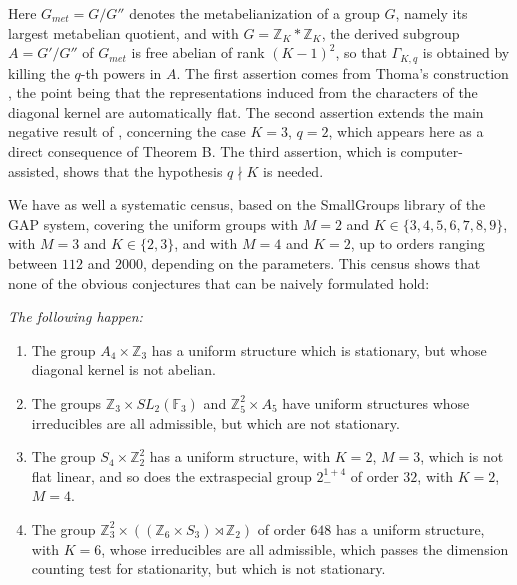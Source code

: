 \documentclass[12pt]{amsart}
\theoremstyle{definition}
\begin{document}
\medskip

Here $G_{met}=G/G''$ denotes the metabelianization of a group $G$, namely its largest metabelian quotient, and with $G=\mathbb Z_K*\mathbb Z_K$, the derived subgroup $A=G'/G''$ of $G_{met}$ is free abelian of rank $(K-1)^2$, so that $\Gamma_{K,q}$ is obtained by killing the $q$-th powers in $A$. The first assertion comes from Thoma's construction \cite{tho}, the point being that the representations induced from the characters of the diagonal kernel are automatically flat. The second assertion extends the main negative result of \cite{bc2}, concerning the case $K=3$, $q=2$, which appears here as a direct consequence of Theorem B. The third assertion, which is computer-assisted, shows that the hypothesis $q\nmid K$ is needed.

We have as well a systematic census, based on the SmallGroups library \cite{bes} of the GAP system, covering the uniform groups with $M=2$ and $K\in\{3,4,5,6,7,8,9\}$, with $M=3$ and $K\in\{2,3\}$, and with $M=4$ and $K=2$, up to orders ranging between $112$ and $2000$, depending on the parameters. This census shows that none of the obvious conjectures that can be naively formulated hold:

\medskip

 {\em The following happen:
\begin{enumerate}
\item The group $A_4\times\mathbb Z_3$ has a uniform structure which is stationary, but whose diagonal kernel is not abelian.

\item The groups $\mathbb Z_3\times SL_2(\mathbb F_3)$ and $\mathbb Z_5^2\times A_5$ have uniform structures whose irreducibles are all admissible, but which are not stationary.

\item The group $S_4\times\mathbb Z_2^2$ has a uniform structure, with $K=2$, $M=3$, which is not flat linear, and so does the extraspecial group $2^{1+4}_-$ of order $32$, with $K=2$, $M=4$.

\item The group $\mathbb Z_3^2\times((\mathbb Z_6\times S_3)\rtimes\mathbb Z_2)$ of order $648$ has a uniform structure, with $K=6$, whose irreducibles are all admissible, which passes the dimension counting test for stationarity, but which is not stationary.
\end{enumerate}}

\medskip
\end{document}
